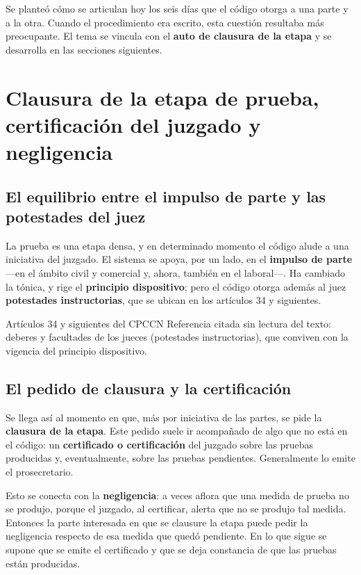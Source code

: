 \documentclass[12pt,oneside]{book}
\begin{document}
Se planteó cómo se articulan hoy los seis días que el código otorga a una parte y a la otra. Cuando el procedimiento era escrito, esta cuestión resultaba más preocupante. El tema se vincula con el \textbf{auto de clausura de la etapa} y se desarrolla en las secciones siguientes.

\section{Clausura de la etapa de prueba, certificación del juzgado y negligencia}

\subsection{El equilibrio entre el impulso de parte y las potestades del juez}

La prueba es una etapa densa, y en determinado momento el código alude a una iniciativa del juzgado. El sistema se apoya, por un lado, en el \textbf{impulso de parte} —en el ámbito civil y comercial y, ahora, también en el laboral—. Ha cambiado la tónica, y rige el \textbf{principio dispositivo}; pero el código otorga además al juez \textbf{potestades instructorias}, que se ubican en los artículos 34 y siguientes.

\begin{norma}{Artículos 34 y siguientes del CPCCN}
Referencia citada sin lectura del texto: deberes y facultades de los jueces (potestades instructorias), que conviven con la vigencia del principio dispositivo.
\end{norma}

\subsection{El pedido de clausura y la certificación}

Se llega así al momento en que, más por iniciativa de las partes, se pide la \textbf{clausura de la etapa}. Este pedido suele ir acompañado de algo que no está en el código: un \textbf{certificado o certificación} del juzgado sobre las pruebas producidas y, eventualmente, sobre las pruebas pendientes. Generalmente lo emite el prosecretario.

Esto se conecta con la \textbf{negligencia}: a veces aflora que una medida de prueba no se produjo, porque el juzgado, al certificar, alerta que no se produjo tal medida. Entonces la parte interesada en que se clausure la etapa puede pedir la negligencia respecto de esa medida que quedó pendiente. En lo que sigue se supone que se emite el certificado y que se deja constancia de que las pruebas están producidas.
\end{document}
